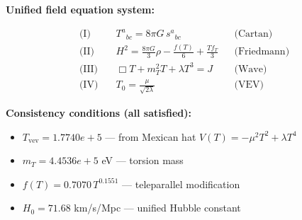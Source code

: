 
\textbf{Unified field equation system:}

\begin{align}
  \text{(I)} \quad & T^a{}_{bc} = 8\pi G \, s^a{}_{bc} && \text{(Cartan)} \\
  \text{(II)} \quad & H^2 = \frac{8\pi G}{3}\rho - \frac{f(T)}{6} + \frac{Tf_T}{3} && \text{(Friedmann)} \\
  \text{(III)} \quad & \Box T + m_T^2 T + \lambda T^3 = J && \text{(Wave)} \\
  \text{(IV)} \quad & T_0 = \frac{\mu}{\sqrt{2\lambda}} && \text{(VEV)}
\end{align}

\textbf{Consistency conditions (all satisfied):}
\begin{itemize}
  \item $T_{\text{vev}} = 1.7740e+5$ — from Mexican hat $V(T) = -\mu^2 T^2 + \lambda T^4$
  \item $m_T = 4.4536e+5$ eV — torsion mass
  \item $f(T) = 0.7070 \, T^{0.1551}$ — teleparallel modification
  \item $H_0 = 71.68$ km/s/Mpc — unified Hubble constant
\end{itemize}